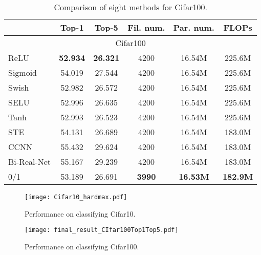 \documentclass[journal]{IEEEtran}
\begin{document}
   \begin{table}[H] \renewcommand{\arraystretch}{1}\addtolength{\tabcolsep}{0.3pt}
\centering
\caption{{Comparison of eight methods for Cifar100.}}\label{com-9-algs2}
\begin{tabular}{lccccc}\hline
{~} & Top-1 & Top-5 & {Fil.  num.} & {Par. num.}& {FLOPs}\\ \hline
\multicolumn{6}{c}{Cifar100}\\\hline
ReLU   &{\bf 52.934}  & {\bf 26.321}   &  4200 & 16.54M & 225.6M\\
Sigmoid   & 54.019  & 27.544&  4200 & 16.54M  & 225.6M\\
Swish      & 52.982  & 26.572& 4200 & 16.54M  & 225.6M\\
SELU          &52.996  & 26.635& 4200 & 16.54M & 225.6M\\
Tanh         &52.993  & 26.523 & 4200 & 16.54M &225.6M\\
STE         &54.131  & 26.689 & 4200 & 16.54M & 183.0M\\
CCNN         &55.432  & 29.624 & 4200 & 16.54M & 183.0M\\
Bi-Real-Net     &55.167  & 29.239 & 4200 & 16.54M & 183.0M\\
0/1 & 53.189  & 26.691   &  {\bf 3990}  & {\bf 16.53M} & {\bf 182.9M}\\\hline
\end{tabular}
\end{table}

\begin{figure*}[!th]
\centering
\texttt{[image: Cifar10\_hardmax.pdf]}\vspace{-2mm}
\caption{Performance on classifying  Cifar10.}
\label{fig:Cifar10}
\end{figure*}


\begin{figure*}[!th]
\centering
\texttt{[image: final\_result\_CIfar100Top1Top5.pdf]}
\vspace{-5mm}
\caption{Performance on classifying Cifar100.}
\label{fig:Cifar100Top5}\vspace{-2mm}
\end{figure*}
\end{document}
